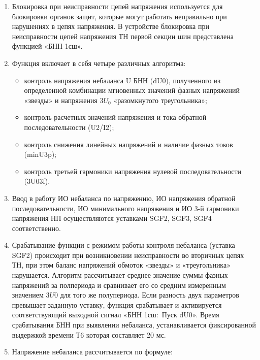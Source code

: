
\color{black}

\begin{enumerate}

\item
Блокировка при неисправности цепей напряжения используется для блокировки органов защит, которые могут работать неправильно при нарушениях в цепях напряжения. В устройстве блокировка при неисправности цепей напряжения ТН первой секции шин представлена функцией «БНН 1сш».

\item
Функция включает в себя четыре различных алгоритма:
\begin{itemize}
    \item контроль напряжения небаланса U БНН (dU0), полученного из определенной комбинации мгновенных значений фазных напряжений «звезды» и напряжения $3U_0$ «разомкнутого треугольника»;
    \item контроль расчетных значений напряжения и тока обратной последовательности (U2/I2);
    \item контроль снижения линейных напряжений и наличие фазных токов (minU3p);
    \item контроль третьей гармоники напряжения нулевой последовательности (3U03f).
\end{itemize}
\item
Ввод в работу ИО небаланса по напряжению, ИО напряжения обратной последовательности, ИО минимального напряжения и ИО 3-й гармоники напряжения НП осуществляются уставками SGF2, SGF3, SGF4 соответственно.
\item
Срабатывание функции с режимом работы контроля небаланса (уставка SGF2) происходит при возникновении неисправности во вторичных цепях ТН, при этом баланс напряжений обмоток «звезды» и «треугольника» нарушается. Алгоритм рассчитывает среднее значение суммы фазных напряжений за полпериода и сравнивает его со средним измеренным значением $3U0$ для того же полупериода. Если разность двух параметров превышает заданную уставку, функция срабатывает и активируется соответствующий выходной сигнал «БНН 1сш:~Пуск dU0». Время срабатывания БНН при выявлении небаланса, устанавливается фиксированной выдержкой времени Т6 которая составляет 20 мс.
\item
Напряжение небаланса рассчитывается по формуле:

\end{enumerate}
